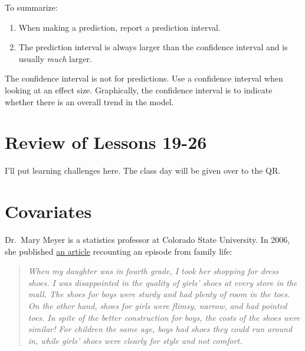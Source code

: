 \documentclass[
  letterpaper,
  DIV=11,
  numbers=noendperiod,
  oneside]{scrreprt}
\providecommand{\tightlist}{%
  \setlength{\itemsep}{0pt}\setlength{\parskip}{0pt}}\usepackage{longtable,booktabs,array}
\begin{document}
To summarize:

\begin{enumerate}
\def\labelenumi{\arabic{enumi}.}
\tightlist
\item
  When making a prediction, report a prediction interval.
\item
  The prediction interval is always larger than the confidence interval
  and is usually \emph{much} larger.
\end{enumerate}

The confidence interval is not for predictions. Use a confidence
interval when looking at an effect size. Graphically, the confidence
interval is to indicate whether there is an overall trend in the model.

\hypertarget{review-of-lessons-19-26}{%
\chapter{Review of Lessons 19-26}\label{review-of-lessons-19-26}}

\begin{tcolorbox}[enhanced jigsaw, colbacktitle=quarto-callout-warning-color!10!white, breakable, opacitybacktitle=0.6, colback=white, left=2mm, arc=.35mm, colframe=quarto-callout-warning-color-frame, coltitle=black, toprule=.15mm, opacityback=0, leftrule=.75mm, bottomtitle=1mm, toptitle=1mm, titlerule=0mm, title=\textcolor{quarto-callout-warning-color}{\faExclamationTriangle}\hspace{0.5em}{Warning}, rightrule=.15mm, bottomrule=.15mm]

I'll put learning challenges here. The class day will be given over to
the QR.

\end{tcolorbox}

\hypertarget{sec-lesson-28}{%
\chapter{Covariates}\label{sec-lesson-28}}

Dr.~Mary Meyer is a statistics professor at Colorado State University.
In 2006, she published
\href{http://jse.amstat.org/v14n1/datasets.meyer.html}{an article}
recounting an episode from family life:

\begin{quote}
\emph{When my daughter was in fourth grade, I took her shopping for
dress shoes. I was disappointed in the quality of girls' shoes at every
store in the mall. The shoes for boys were sturdy and had plenty of room
in the toes. On the other hand, shoes for girls were flimsy, narrow, and
had pointed toes. In spite of the better construction for boys, the
costs of the shoes were similar! For children the same age, boys had
shoes they could run around in, while girls' shoes were clearly for
style and not comfort.}
\end{quote}
\end{document}
